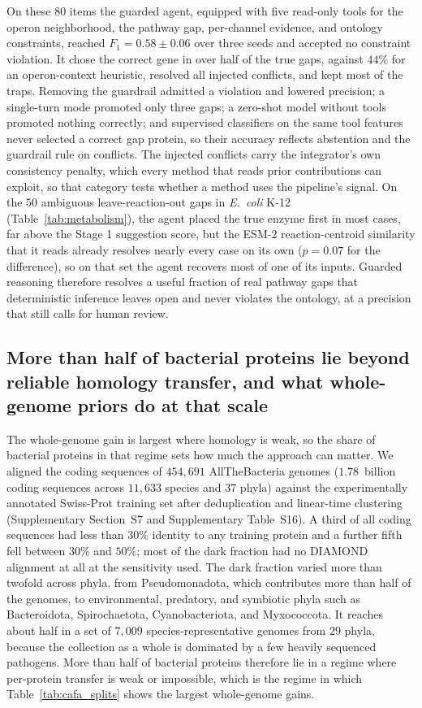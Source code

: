 \documentclass[10pt,twocolumn]{article}
\begin{document}
On these $80$ items the guarded agent, equipped with five read-only tools for the operon neighborhood, the pathway gap, per-channel evidence, and ontology constraints, reached $F_1 = 0.58 \pm 0.06$ over three seeds and accepted no constraint violation. It chose the correct gene in over half of the true gaps, against $44\%$ for an operon-context heuristic, resolved all injected conflicts, and kept most of the traps. Removing the guardrail admitted a violation and lowered precision; a single-turn mode promoted only three gaps; a zero-shot model without tools promoted nothing correctly; and supervised classifiers on the same tool features never selected a correct gap protein, so their accuracy reflects abstention and the guardrail rule on conflicts. The injected conflicts carry the integrator's own consistency penalty, which every method that reads prior contributions can exploit, so that category tests whether a method uses the pipeline's signal. On the $50$ ambiguous leave-reaction-out gaps in \textit{E.~coli} K-12 (Table~\ref{tab:metabolism}), the agent placed the true enzyme first in most cases, far above the Stage 1 suggestion score, but the ESM-2 reaction-centroid similarity that it reads already resolves nearly every case on its own ($p = 0.07$ for the difference), so on that set the agent recovers most of one of its inputs. Guarded reasoning therefore resolves a useful fraction of real pathway gaps that deterministic inference leaves open and never violates the ontology, at a precision that still calls for human review.

\subsection{More than half of bacterial proteins lie beyond reliable homology transfer, and what whole-genome priors do at that scale}
\label{sec:results_allthebacteria}

The whole-genome gain is largest where homology is weak, so the share of bacterial proteins in that regime sets how much the approach can matter. We aligned the coding sequences of $454{,}691$ AllTheBacteria genomes \citep{hunt2024allthebacteria} ($1.78$~billion coding sequences across $11{,}633$ species and $37$ phyla) against the experimentally annotated Swiss-Prot training set after deduplication and linear-time clustering (Supplementary Section~S7 and Supplementary Table~S16). A third of all coding sequences had less than $30\%$ identity to any training protein and a further fifth fell between $30\%$ and $50\%$; most of the dark fraction had no DIAMOND alignment at all at the sensitivity used. The dark fraction varied more than twofold across phyla, from Pseudomonadota, which contributes more than half of the genomes, to environmental, predatory, and symbiotic phyla such as Bacteroidota, Spirochaetota, Cyanobacteriota, and Myxococcota. It reaches about half in a set of $7{,}009$ species-representative genomes from $29$ phyla, because the collection as a whole is dominated by a few heavily sequenced pathogens. More than half of bacterial proteins therefore lie in a regime where per-protein transfer is weak or impossible, which is the regime in which Table~\ref{tab:cafa_splits} shows the largest whole-genome gains.
\end{document}
